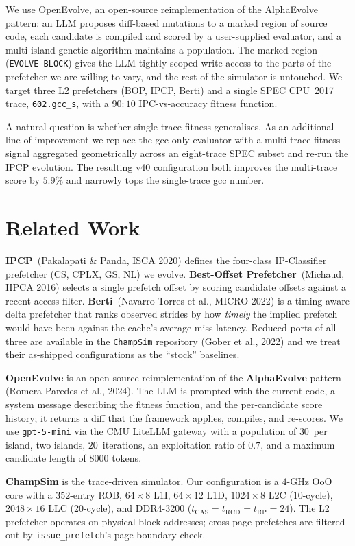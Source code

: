 \documentclass[11pt]{article}
\begin{document}
We use OpenEvolve, an open-source reimplementation of the AlphaEvolve
pattern: an LLM proposes diff-based mutations to a marked region of
source code, each candidate is compiled and scored by a user-supplied
evaluator, and a multi-island genetic algorithm maintains a population.
The marked region (\texttt{EVOLVE-BLOCK}) gives the LLM tightly scoped
write access to the parts of the prefetcher we are willing to vary, and
the rest of the simulator is untouched. We target three L2 prefetchers
(BOP, IPCP, Berti) and a single SPEC CPU~2017 trace, \texttt{602.gcc\_s},
with a $90{:}10$ IPC-vs-accuracy fitness function.

A natural question is whether single-trace fitness generalises. As an
additional line of improvement we replace the gcc-only evaluator with a
multi-trace fitness signal aggregated geometrically across an eight-trace
SPEC subset and re-run the IPCP evolution. The resulting v40
configuration both improves the multi-trace score by $5.9\%$ and
narrowly tops the single-trace gcc number.

\section{Related Work}

\textbf{IPCP}~(Pakalapati \& Panda, ISCA 2020) defines the four-class
IP-Classifier prefetcher (CS, CPLX, GS, NL) we evolve.
\textbf{Best-Offset Prefetcher}~(Michaud, HPCA 2016) selects a single
prefetch offset by scoring candidate offsets against a recent-access
filter. \textbf{Berti}~(Navarro Torres et al., MICRO 2022) is a
timing-aware delta prefetcher that ranks observed strides by how
\emph{timely} the implied prefetch would have been against the cache's
average miss latency. Reduced ports of all three are available in the
\texttt{ChampSim} repository (Gober et al., 2022) and we treat their
as-shipped configurations as the ``stock'' baselines.

\textbf{OpenEvolve} is an open-source reimplementation of the
\textbf{AlphaEvolve} pattern (Romera-Paredes et al., 2024). The LLM is
prompted with the current code, a system message describing the
fitness function, and the per-candidate score history; it returns a
diff that the framework applies, compiles, and re-scores. We use
\texttt{gpt-5-mini} via the CMU LiteLLM gateway with a population of
$30$~per island, two islands, $20$~iterations, an exploitation ratio of
$0.7$, and a maximum candidate length of $8000$ tokens.

\textbf{ChampSim} is the trace-driven simulator. Our configuration is a
$4$-GHz OoO core with a $352$-entry ROB, $64{\times}8$ L1I,
$64{\times}12$ L1D, $1024{\times}8$ L2C ($10$-cycle), $2048{\times}16$
LLC ($20$-cycle), and DDR4-3200 ($t_{\text{CAS}}{=}t_{\text{RCD}}{=}t_{\text{RP}}{=}24$).
The L2 prefetcher operates on physical block addresses; cross-page
prefetches are filtered out by \texttt{issue\_prefetch}'s page-boundary
check.
\end{document}
